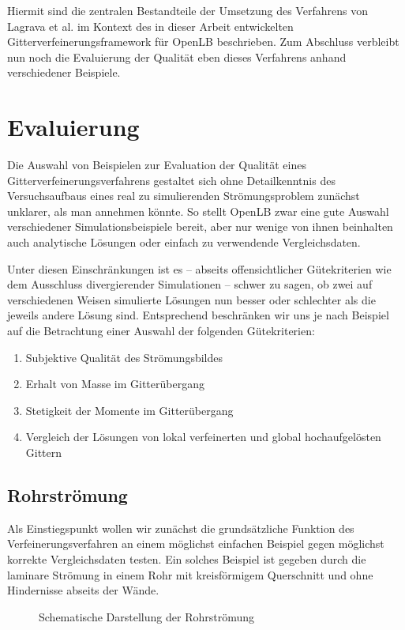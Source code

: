 Hiermit sind die zentralen Bestandteile der Umsetzung des Verfahrens von Lagrava et al. im Kontext des in dieser Arbeit entwickelten Gitterverfeinerungsframework für OpenLB beschrieben. Zum Abschluss verbleibt nun noch die Evaluierung der Qualität eben dieses Verfahrens anhand verschiedener Beispiele.

\newpage
\section{Evaluierung}

Die Auswahl von Beispielen zur Evaluation der Qualität eines Gitterverfeinerungsverfahrens gestaltet sich ohne Detailkenntnis des Versuchsaufbaus eines real zu simulierenden Strömungsproblem zunächst unklarer, als man annehmen könnte. So stellt OpenLB zwar eine gute Auswahl verschiedener Simulationsbeispiele bereit, aber nur wenige von ihnen beinhalten auch analytische Lösungen oder einfach zu verwendende Vergleichsdaten.

Unter diesen Einschränkungen ist es -- abseits offensichtlicher Gütekriterien wie dem Ausschluss divergierender Simulationen -- schwer zu sagen, ob zwei auf verschiedenen Weisen simulierte Lösungen nun besser oder schlechter als die jeweils andere Lösung sind. Entsprechend beschränken wir uns je nach Beispiel auf die Betrachtung einer Auswahl der folgenden Gütekriterien:
\begin{enumerate}
	\item Subjektive Qualität des Strömungsbildes
	\item Erhalt von Masse im Gitterübergang
	\item Stetigkeit der Momente im Gitterübergang
	\item Vergleich der Lösungen von lokal verfeinerten und global hochaufgelösten Gittern
\end{enumerate}

\newpage
\subsection{Rohrströmung}

Als Einstiegspunkt wollen wir zunächst die grundsätzliche Funktion des Verfeinerungsverfahren an einem möglichst einfachen Beispiel gegen möglichst korrekte Vergleichsdaten testen. Ein solches Beispiel ist gegeben durch die laminare Strömung in einem Rohr mit kreisförmigem Querschnitt und ohne Hindernisse abseits der Wände.

\begin{figure}[h]
\centering

\caption{Schematische Darstellung der Rohrströmung}
\label{fig:PoiseuilleOverview}
\end{figure}

